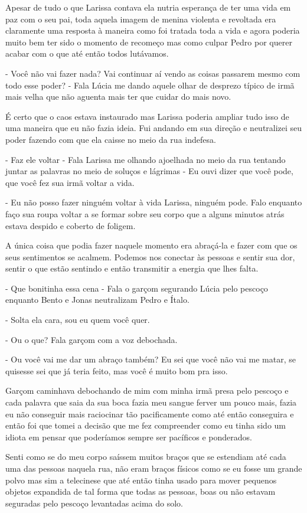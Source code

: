 Apesar de tudo o que Larissa contava ela nutria esperança de ter uma vida em paz com o seu pai, toda aquela imagem de menina violenta e revoltada era claramente uma resposta à maneira como foi tratada toda a vida e agora poderia muito bem ter sido o momento de recomeço mas como culpar Pedro por querer acabar com o que até então todos lutávamos.

- Você não vai fazer nada? Vai continuar aí vendo as coisas passarem mesmo com todo esse poder? - Fala Lúcia me dando aquele olhar de desprezo típico de irmã mais velha que não aguenta mais ter que cuidar do mais novo.

É certo que o caos estava instaurado mas Larissa poderia ampliar tudo isso de uma maneira que eu não fazia ideia. Fui andando em sua direção e neutralizei seu poder fazendo com que ela caisse no meio da rua indefesa.

- Faz ele voltar - Fala Larissa me olhando ajoelhada no meio da rua tentando juntar as palavras no meio de soluços e lágrimas - Eu ouvi dizer que você pode, que você fez sua irmã voltar a vida.

- Eu não posso fazer ninguém voltar à vida Larissa, ninguém pode. Falo enquanto faço sua roupa voltar a se formar sobre seu corpo que a alguns minutos atrás estava despido e coberto  de foligem.

A única coisa que podia fazer naquele momento era abraçá-la e fazer com que os seus sentimentos se acalmem. Podemos nos conectar às pessoas e sentir sua dor, sentir o que estão sentindo e então transmitir a energia que lhes falta.

- Que bonitinha essa cena - Fala o garçom segurando Lúcia pelo pescoço enquanto Bento e Jonas neutralizam Pedro e Ítalo.

- Solta ela cara, sou eu quem você quer.

- Ou o que? Fala garçom com a voz debochada.

- Ou você vai me dar um abraço também? Eu sei que você não vai me matar, se quisesse sei que já teria feito, mas você é muito bom pra isso.

Garçom caminhava debochando de mim com minha irmã presa pelo pescoço e cada palavra que saia da sua boca fazia meu sangue ferver um pouco mais, fazia eu não conseguir mais raciocinar tão pacificamente como até então conseguira e então foi que tomei a decisão que me fez compreender como eu tinha sido um idiota em pensar que poderíamos sempre ser pacíficos e ponderados.

Senti como se do meu corpo saíssem muitos braços que se estendiam até cada uma das pessoas naquela rua, não eram braços físicos como se eu fosse um grande polvo mas sim a telecinese que até então tinha usado para mover pequenos objetos expandida de tal forma que todas as pessoas, boas ou não estavam seguradas pelo pescoço levantadas acima do solo.

